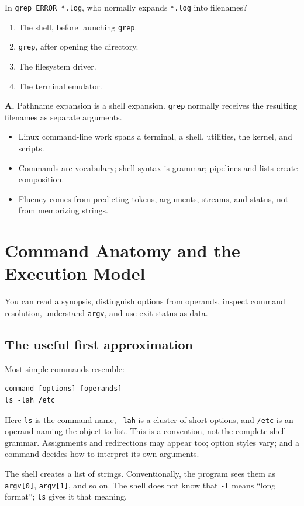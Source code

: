 \documentclass[11pt,oneside,openany]{book}
\newcommand{\fourchoices}[4]{%
  \begin{enumerate}[label=\Alph*),leftmargin=2em,itemsep=0.25em]
    \item #1
    \item #2
    \item #3
    \item #4
  \end{enumerate}}
\newcommand{\chaptergoals}[1]{%
  \begin{tcolorbox}[colback=Paper,colframe=Blue,title={Learning outcomes},fonttitle=\bfseries]
  #1
  \end{tcolorbox}}
\begin{document}
\begin{questionbox}[title={Hard 1.2 -- Responsibility}]
In \texttt{grep ERROR *.log}, who normally expands \texttt{*.log} into filenames?
\fourchoices{The shell, before launching \texttt{grep}.}{\texttt{grep}, after opening the directory.}{The filesystem driver.}{The terminal emulator.}
\end{questionbox}
\begin{answerbox}
\textbf{A.} Pathname expansion is a shell expansion. \texttt{grep} normally receives the resulting filenames as separate arguments.
\end{answerbox}

\begin{recapbox}
\begin{itemize}
  \item Linux command-line work spans a terminal, a shell, utilities, the kernel, and scripts.
  \item Commands are vocabulary; shell syntax is grammar; pipelines and lists create composition.
  \item Fluency comes from predicting tokens, arguments, streams, and status, not from memorizing strings.
\end{itemize}
\end{recapbox}

\chapter{Command Anatomy and the Execution Model}
\chaptergoals{You can read a synopsis, distinguish options from operands, inspect command resolution, understand \texttt{argv}, and use exit status as data.}

\section{The useful first approximation}
Most simple commands resemble:
\begin{lstlisting}
command [options] [operands]
ls -lah /etc
\end{lstlisting}
Here \texttt{ls} is the command name, \texttt{-lah} is a cluster of short options, and \texttt{/etc} is an operand naming the object to list. This is a convention, not the complete shell grammar. Assignments and redirections may appear too; option styles vary; and a command decides how to interpret its own arguments.

\begin{mentalmodel}
The shell creates a list of strings. Conventionally, the program sees them as \texttt{argv[0]}, \texttt{argv[1]}, and so on. The shell does not know that \texttt{-l} means “long format”; \texttt{ls} gives it that meaning.
\end{mentalmodel}
\end{document}
